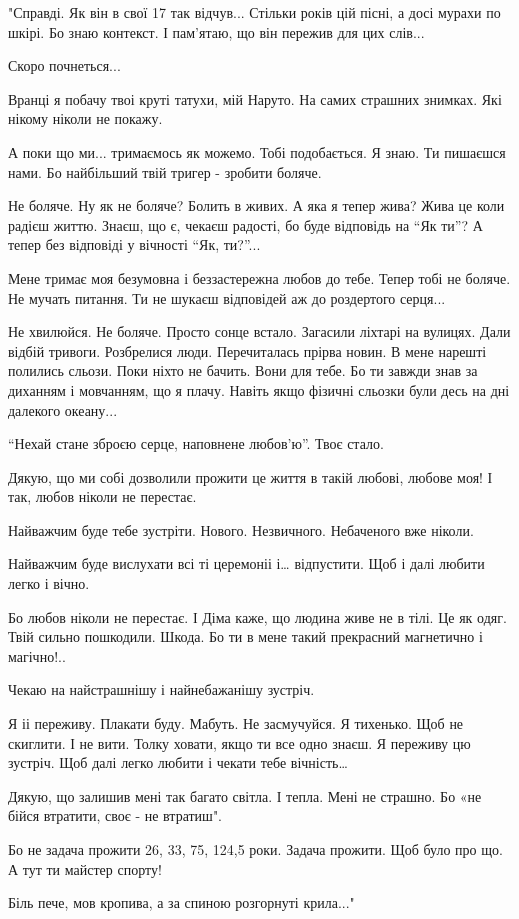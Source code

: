  
 
 
 
 

\begingroup
\em

"Справді. Як він в свої 17 так відчув... Стільки років цій пісні, а досі мурахи
по шкірі. Бо знаю контекст. І пам'ятаю, що він пережив для цих слів...

Скоро почнеться...

Вранці я побачу твоі круті татухи, мій Наруто. На самих страшних знимках. Які
нікому ніколи не покажу. 

А поки що ми... тримаємось як можемо. Тобі подобається. Я знаю. Ти пишаєшся нами.
Бо найбільший твій тригер - зробити боляче. 

Не боляче. Ну як не боляче? Болить в живих. А яка я тепер жива? Жива це коли
радієш життю. Знаєш, що є, чекаєш радості, бо буде відповідь на \enquote{Як ти}? А
тепер без відповіді у вічності \enquote{Як, ти?}...

Мене тримає моя безумовна і беззастережна любов до тебе. Тепер тобі не боляче.
Не мучать питання. Ти не шукаєш відповідей аж до роздертого серця... 

Не хвилюйся. Не боляче. Просто сонце встало. Загасили ліхтарі на вулицях. Дали
відбій тривоги. Розбрелися люди. Перечиталась прірва новин. В мене нарешті
полились сльози. Поки ніхто не бачить. Вони для тебе. Бо ти завжди знав за
диханням і мовчанням, що я плачу. Навіть якщо фізичні сльозки були десь на дні
далекого океану... 

\enquote{Нехай стане зброєю серце, наповнене любов'ю}. Твоє стало. 

Дякую, що ми собі дозволили прожити це життя в такій любові, любове моя! І так,
любов ніколи не перестає. 

Найважчим буде тебе зустріти. Нового. Незвичного. Небаченого вже ніколи. 

Найважчим буде вислухати всі ті церемоніі і… відпустити. Щоб і далі любити
легко і вічно. 

Бо любов ніколи не перестає. І Діма каже, що людина живе не в тілі. Це як одяг.
Твій сильно пошкодили. Шкода. Бо ти в мене такий прекрасний магнетично і
магічно!.. 

Чекаю на найстрашнішу і найнебажанішу зустріч. 

Я іі переживу. Плакати буду. Мабуть. Не засмучуйся. Я тихенько. Щоб не
скиглити. І не вити. Толку ховати, якщо ти все одно знаєш. Я переживу цю
зустріч. Щоб далі легко любити і чекати тебе вічність… 

Дякую, що залишив мені так багато світла. І тепла. Мені не страшно. Бо «не
бійся втратити, своє - не втратиш".

Бо не задача прожити 26, 33, 75, 124,5 роки. Задача  прожити. Щоб було про що.
А тут ти майстер спорту! 

Біль пече, мов кропива, а за спиною розгорнуті крила..."

\endgroup
